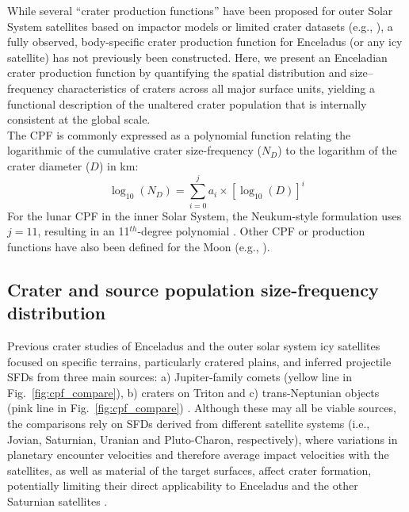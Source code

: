 \documentclass[preprint,11pt,3p,times,authoryear]{elsarticle}
\begin{document}
While several ``crater production functions'' have been proposed for outer Solar System satellites based on impactor models or limited crater datasets (e.g., \citealt{Zahnle2003, Kirchoff2009, Singer2019, Wong2023}), a fully observed, body-specific crater production function for Enceladus (or any icy satellite) has not previously been constructed. Here, we present an Enceladian crater production function by quantifying the spatial distribution and size–frequency characteristics of craters across all major surface units, yielding a functional description of the unaltered crater population that is internally consistent at the global scale. \\

The CPF is commonly expressed as a polynomial function relating the logarithmic of the cumulative crater size-frequency ($N_{D}$) to the logarithm of the crater diameter ($D$) in km:
\begin{equation}
  \log_{10}(N_{D}) = \sum_{i=0}^{j} a_{i} \times [\log_{10}(D)]^i
\end{equation}
For the lunar CPF in the inner Solar System, the Neukum-style formulation uses $j = 11$, resulting in an 11$^{th}$-degree polynomial \citep{Neukum2001}. Other CPF or production functions have also been defined for the Moon (e.g., \citealt{Marchi2009}).\\

\subsection{Crater and source population size-frequency distribution}
Previous crater studies of Enceladus and the outer solar system icy satellites focused on specific terrains, particularly cratered plains, and inferred projectile SFDs from three main sources:
a) Jupiter-family comets (yellow line in Fig.~\ref{fig:cpf_compare}), b) craters on Triton 
and c) trans-Neptunian objects (pink line in Fig.~\ref{fig:cpf_compare}) \citep{Zahnle2003, Singer2019, Bottke2024}.
Although these may all be viable sources, the comparisons rely on SFDs derived from different satellite systems (i.e., Jovian, Saturnian, Uranian and Pluto-Charon, respectively), where variations in planetary encounter velocities and therefore average impact velocities with the satellites, as well as material of the target surfaces, affect crater formation, potentially limiting their direct applicability to Enceladus and the other Saturnian satellites \citep{Neukum1983,Zahnle2003,DiSisto2007,DiSisto2011,DiSisto2013,DiSisto2016,Rossignoli2019,DiSisto2020,Rossignoli2022}.\\
\end{document}

